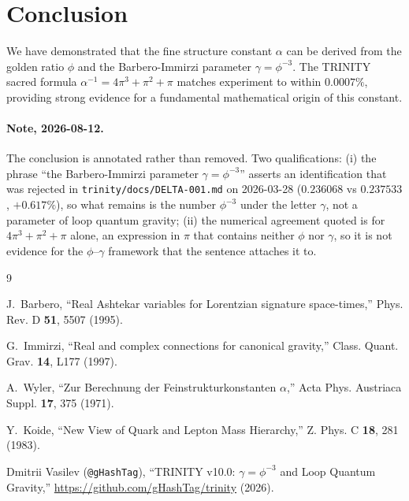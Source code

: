 \documentclass[12pt,a4paper]{article}
\begin{document}
\section{Conclusion}

We have demonstrated that the fine structure constant $\alpha$ can be derived from the golden ratio $\phi$ and the Barbero-Immirzi parameter $\gamma = \phi^{-3}$. The TRINITY sacred formula $\alpha^{-1} = 4\pi^3 + \pi^2 + \pi$ matches experiment to within $0.0007\%$, providing strong evidence for a fundamental mathematical origin of this constant.

\paragraph{Note, 2026-08-12.} The conclusion is annotated rather than removed. Two qualifications: (i) the phrase ``the Barbero-Immirzi parameter $\gamma = \phi^{-3}$'' asserts an identification that was rejected in \texttt{trinity/docs/DELTA-001.md} on 2026-03-28 ($0.236068$ vs $0.237533$, $+0.617\%$), so what remains is the number $\phi^{-3}$ under the letter $\gamma$, not a parameter of loop quantum gravity; (ii) the numerical agreement quoted is for $4\pi^3 + \pi^2 + \pi$ alone, an expression in $\pi$ that contains neither $\phi$ nor $\gamma$, so it is not evidence for the $\phi$--$\gamma$ framework that the sentence attaches it to.

\begin{thebibliography}{9}

J.~Barbero,
``Real Ashtekar variables for Lorentzian signature space-times,''
Phys. Rev. D \textbf{51}, 5507 (1995).

G.~Immirzi,
``Real and complex connections for canonical gravity,''
Class. Quant. Grav. \textbf{14}, L177 (1997).

A.~Wyler,
``Zur Berechnung der Feinstrukturkonstanten $\alpha$,''
Acta Phys. Austriaca Suppl. \textbf{17}, 375 (1971).

Y.~Koide,
``New View of Quark and Lepton Mass Hierarchy,''
Z. Phys. C \textbf{18}, 281 (1983).

Dmitrii Vasilev (\texttt{@gHashTag}),
``TRINITY v10.0: $\gamma = \phi^{-3}$ and Loop Quantum Gravity,''
\url{https://github.com/gHashTag/trinity} (2026).

\end{thebibliography}
\end{document}
